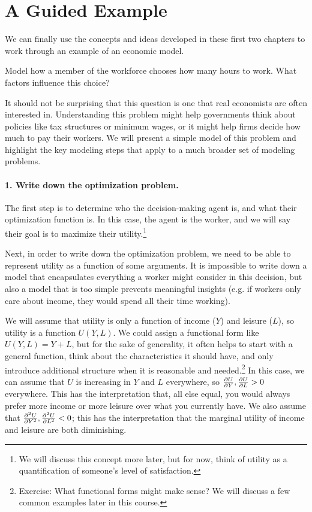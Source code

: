 \section{A Guided Example}

We can finally use the concepts and ideas developed in these first two chapters to work through an example of an economic model. 

\begin{example*}
Model how a member of the workforce chooses how many hours to work. What factors influence this choice?
\end{example*}

It should not be surprising that this question is one that real economists are often interested in. Understanding this problem might help governments think about policies like tax structures or minimum wages, or it might help firms decide how much to pay their workers. We will present a simple model of this problem and highlight the key modeling steps that apply to a much broader set of modeling problems.

\paragraph{1. Write down the optimization problem.}

The first step is to determine who the decision-making agent is, and what their optimization function is. In this case, the agent is the worker, and we will say their goal is to maximize their utility.\footnote{We will discuss this concept more later, but for now, think of utility as a quantification of someone's level of satisfaction.} 

Next, in order to write down the optimization problem, we need to be able to represent utility as a function of some arguments. It is impossible to write down a model that encapsulates everything a worker might consider in this decision, but also a model that is too simple prevents meaningful insights (e.g. if workers only care about income, they would spend all their time working). 

We will assume that utility is only a function of income ($Y$) and leisure ($L$), so utility is a function $U(Y, L)$. We could assign a functional form like $U(Y, L) = Y + L$, but for the sake of generality, it often helps to start with a general function, think about the characteristics it should have, and only introduce additional structure when it is reasonable and needed.\footnote{Exercise: What functional forms might make sense? We will discuss a few common examples later in this course.} In this case, we can assume that $U$ is increasing in $Y$ and $L$ everywhere, so $\frac{\partial U}{\partial Y}, \frac{\partial U}{\partial L} > 0$ everywhere. This has the interpretation that, all else equal, you would always prefer more income or more leisure over what you currently have. We also assume that $\frac{\partial ^2 U}{\partial Y^2}, \frac{\partial ^2 U}{\partial L^2} < 0$; this has the interpretation that the marginal utility of income and leisure are both diminishing.

